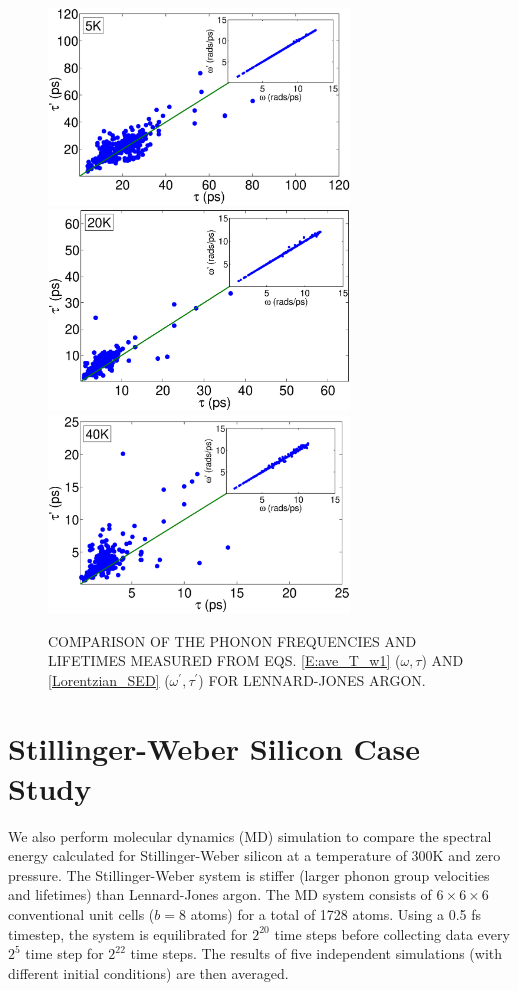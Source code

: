 \documentclass[twocolumn,10pt]{asme2e}
\begin{document}
\begin{figure}
\begin{center}
\includegraphics[angle=0,width=80.0mm]{LJ_NMD_SED_5K_2.eps}
\includegraphics[angle=0,width=80.0mm]{LJ_NMD_SED_20K_2.eps}
\includegraphics[angle=0,width=80.0mm]{LJ_NMD_SED_40K_2.eps}
\end{center}
\caption{\label{F:FREQ_LIFE_LJ} COMPARISON OF THE PHONON FREQUENCIES AND LIFETIMES MEASURED FROM EQS$.$ \eqref{E:ave_T_w1} ($\omega,\tau$) AND \eqref{Lorentzian_SED} ($\omega^{'},\tau^{'}$) FOR LENNARD-JONES ARGON.}
\end{figure}

\section*{Stillinger-Weber Silicon Case Study}\label{S:Si_Case_study}

We also perform molecular dynamics (MD) simulation to compare the spectral energy calculated for Stillinger-Weber silicon \cite{stillinger1985} at a temperature of $300$K and zero pressure. The Stillinger-Weber system is stiffer (larger phonon group velocities and lifetimes) than Lennard-Jones argon. The MD system consists
of $6\times 6\times 6$ conventional unit cells ($b=8$ atoms) for a total of 1728 atoms.
Using a 0.5 fs timestep, the system is equilibrated for $2^{20}$ time steps before collecting data every $2^5$ time step for $2^{22}$ time steps. The results of five independent simulations (with different initial conditions) are then averaged.
\end{document}
